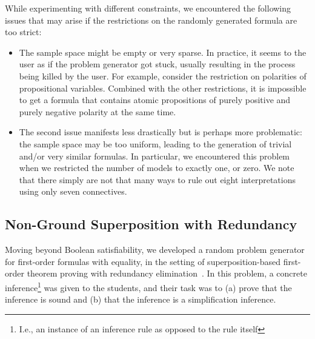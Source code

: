While experimenting with different constraints, we encountered the following
issues that may arise if the restrictions on the randomly generated formula are too strict:
\begin{itemize}
    \item
        The sample space might be empty or very sparse.
        In practice, it seems to the user as if the problem generator got stuck,
        usually resulting in the process being killed by the user.
        For example, consider the restriction on polarities of propositional variables.
        Combined with the other restrictions,
        it is impossible to get a formula that contains atomic propositions
        of purely positive and purely negative polarity at the same time.
    \item
        The second issue manifests less drastically but is perhaps more problematic:
        the sample space may be too uniform,
        leading to the generation of trivial and/or very similar formulas.
        In particular, we encountered this problem
        when we restricted the number of models to exactly one, or zero.
        We note that there simply are not that many ways to rule out eight interpretations
        using only seven connectives.
\end{itemize}





\subsection{Non-Ground Superposition with Redundancy}\label{sec:fo}

Moving beyond Boolean satisfiability, we developed a random problem
generator for first-order formulas with equality, in the setting of
superposition-based first-order theorem proving with redundancy elimination~\cite{Rubio01,Vampire13}.
In this problem, a concrete inference\footnote{I.e., an instance of an inference rule as opposed to the rule itself}
was given to the students, and their task was to
(a) prove that the inference is sound
and (b) that the inference is a simplification inference.

